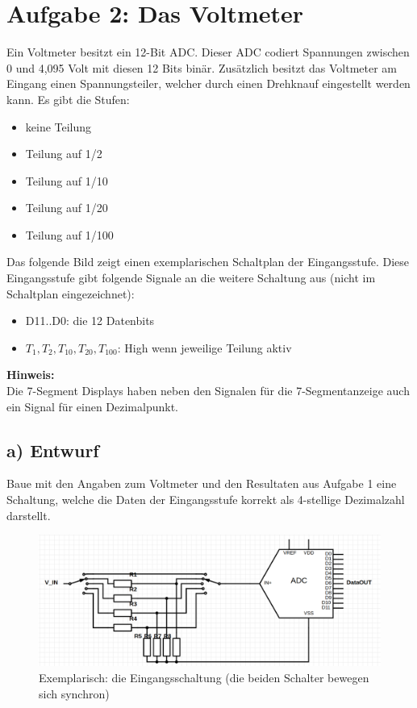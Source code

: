 \documentclass[a4paper]{scrartcl}
\begin{document}
\section*{Aufgabe 2: Das Voltmeter}
Ein Voltmeter besitzt ein 12-Bit ADC. Dieser ADC codiert Spannungen zwischen 0 und 4,095 Volt mit diesen 12 Bits binär.
Zusätzlich besitzt das Voltmeter am Eingang einen Spannungsteiler, welcher durch einen Drehknauf eingestellt werden kann.
Es gibt die Stufen:
\begin{itemize}
  \item keine Teilung
  \item Teilung auf 1/2
  \item Teilung auf 1/10
  \item Teilung auf 1/20
  \item Teilung auf 1/100
\end{itemize} 
Das folgende Bild zeigt einen exemplarischen Schaltplan der Eingangsstufe.
Diese Eingangsstufe gibt folgende Signale an die weitere Schaltung aus (nicht im Schaltplan eingezeichnet):
\begin{itemize}
  \item D11..D0: die 12 Datenbits
  \item $T_1, T_{2}, T_{10}, T_{20}, T_{100}$: High wenn jeweilige Teilung aktiv
\end{itemize}

\textbf{Hinweis:}\\
Die 7-Segment Displays haben neben den Signalen für die 7-Segmentanzeige auch ein Signal für einen Dezimalpunkt. 

\subsection*{a) Entwurf}
Baue mit den Angaben zum Voltmeter und den
Resultaten aus Aufgabe 1 eine Schaltung,
welche die Daten der Eingangsstufe korrekt als 4-stellige Dezimalzahl darstellt.\\



\begin{figure}
  \centering
  \includegraphics[width=12cm]{Voltmeter.png}
  \caption{Exemplarisch: die Eingangsschaltung (die beiden Schalter bewegen sich synchron)}
\end{figure}
\end{document}
